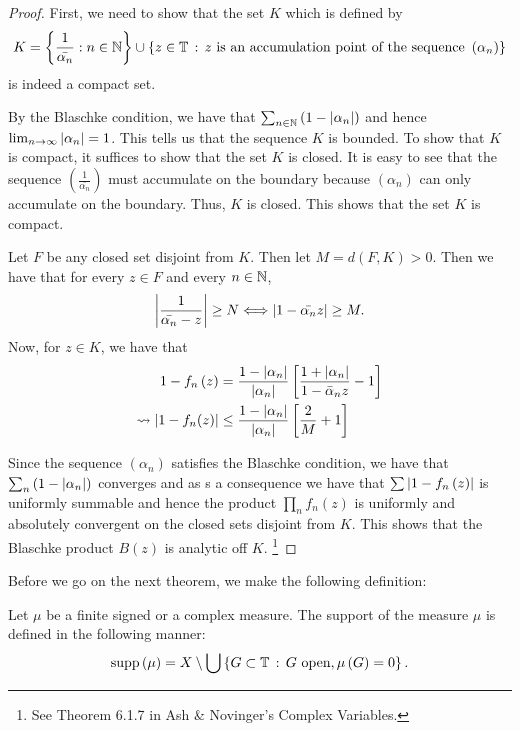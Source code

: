 \begin{proof}
    First, we need to show that the set $K$ which is defined by
    \begin{equation*}
	K= \left\{ \frac{1}{\bar{\alpha_{n}}} : n \in \mathbb N \right\} \cup \left\{ z \in \mathbb T \, : \, z \text{ is an accumulation point of the sequence } \left( \alpha_{n} \right) \right\}
    \end{equation*}
    is indeed a compact set.

    By the Blaschke condition, we have that $\sum_{n \in \mathbb N} \left( 1- \left\lvert \alpha_{n} \right\rvert \right)$ and hence $\lim_{n\to \infty} \left\lvert \alpha_{n} \right\rvert = 1$. This tells us that the sequence $K$ is bounded. To show that $K$ is compact, it suffices to show that the set $K$ is closed. It is easy to see that the sequence $\left( \frac{1}{\bar{\alpha_{n}}} \right)$ must accumulate on the boundary because $\left( \alpha_{n} \right)$ can only accumulate on the boundary. Thus, $K$ is closed. This shows that the set $K$ is compact.

    Let $F$ be any closed set disjoint from $K$. Then let $M= d\left( F,K \right) > 0$. Then we have that for every $z\in F$ and every $n\in\mathbb N$, 
    \begin{equation*}
	\left\lvert \frac{1}{\bar{\alpha_{n}}-z} \right\rvert \ge N \Longleftrightarrow \left\lvert 1-\bar{\alpha_{n}}z \right\rvert \ge M.
    \end{equation*}
    Now, for $z\in K$, we have that
    \begin{align*}
	1-f_{n}\left( z \right) &= \frac{1-\left\lvert \alpha_{n} \right\rvert}{\left\lvert \alpha_{n} \right\rvert} \left[ \frac{1+\left\lvert \alpha_{n} \right\rvert}{1-\bar{\alpha}_{n}z} -1 \right] \\
	\leadsto \left\lvert 1-f_{n}(z) \right\rvert &\le \frac{1-\left\lvert \alpha_{n} \right\rvert}{\left\lvert \alpha_{n} \right\rvert} \left[ \frac{2}{M} + 1 \right]
    \end{align*}

    Since the sequence $\left( \alpha_{n} \right)$ satisfies the Blaschke condition, we have that $\sum_{n} \left( 1- \left\lvert \alpha_{n} \right\rvert \right)$ converges and as s a consequence we have that $\sum \left\lvert 1-f_{n}\left( z \right) \right\rvert$ is uniformly summable and hence the product $\prod_{n} f_{n} \left( z \right)$ is uniformly and absolutely convergent on the closed sets disjoint from $K$. This shows that the Blaschke product $B\left( z \right)$ is analytic off $K$. \footnote{See Theorem 6.1.7 in Ash \& Novinger's Complex Variables.} 
\end{proof}

Before we go on the next theorem, we make the following definition:
\begin{definition}
    Let $\mu$ be a finite signed or a complex measure. The support of the measure $\mu$ is defined in the following manner:
    \begin{equation*}
	\operatorname{supp} \left( \mu \right) = X \setminus \bigcup \left\{ G \subset \mathbb T \, : \, G \text{ open}, \mu \left( G \right) = 0 \right\}.
    \end{equation*}
    \label{def:support-of-a-measure}
\end{definition}

